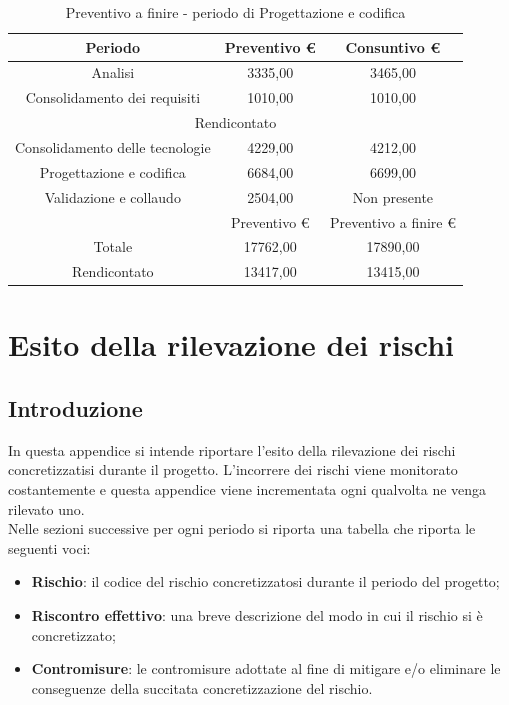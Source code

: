 \documentclass[./PianodiProgetto.tex]{subfiles}
\begin{document}
\begin{table}[H]
	\centering
	\begin{tabular}{|c|c|c|}
		\hline
		Periodo&Preventivo \euro{}&Consuntivo \euro{} \\ \hline
		Analisi&3335,00&3465,00  \\ \hline
		Consolidamento dei requisiti&1010,00&1010,00  \\ \hline
		\multicolumn{3}{|c|}{Rendicontato}  \\ \hline
		Consolidamento delle tecnologie&4229,00&4212,00  \\ \hline
		Progettazione e codifica&6684,00&6699,00  \\ \hline
		Validazione e collaudo&2504,00&Non presente  \\ \hline
		&Preventivo \euro{}&Preventivo a finire \euro{}  \\ \hline
		Totale&17762,00&17890,00 \\ \hline
		Rendicontato&13417,00&13415,00 \\ \hline
	\end{tabular}
	\caption{Preventivo a finire - periodo di Progettazione e codifica}
\end{table}


\appendix


\appendix

\chapter{Esito della rilevazione dei rischi}

\section{Introduzione}

In questa appendice si intende riportare l'esito della rilevazione dei rischi concretizzatisi durante il progetto. L'incorrere dei rischi viene monitorato costantemente e questa appendice viene incrementata ogni qualvolta ne venga rilevato uno. \\
Nelle sezioni successive per ogni periodo si riporta una tabella che riporta le seguenti voci:

\begin{itemize}
	\item \textbf{Rischio}: il codice del rischio concretizzatosi durante il periodo del progetto;
	\item \textbf{Riscontro effettivo}: una breve descrizione del modo in cui il rischio si è concretizzato;
	\item \textbf{Contromisure}: le contromisure adottate al fine di mitigare e/o eliminare le conseguenze della succitata concretizzazione del rischio.
\end{itemize}
\end{document}
